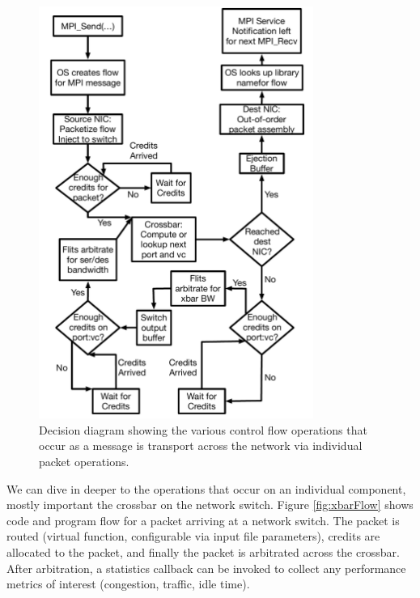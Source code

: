 \begin{figure}
\includegraphics[width=0.8\textwidth]{figures/DecisionFlow}
\caption{Decision diagram showing the various control flow operations that occur as a message is transport across the network via individual packet operations.}
\label{fig:controlFlow}
\end{figure}

We can dive in deeper to the operations that occur on an individual component, mostly important the crossbar on the network switch. Figure \ref{fig:xbarFlow} shows code and program flow for a packet arriving at a network switch.  The packet is routed (virtual function, configurable via input file parameters), credits are allocated to the packet, and finally the packet is arbitrated across the crossbar. After arbitration, a statistics callback can be invoked to collect any performance metrics of interest (congestion, traffic, idle time).

